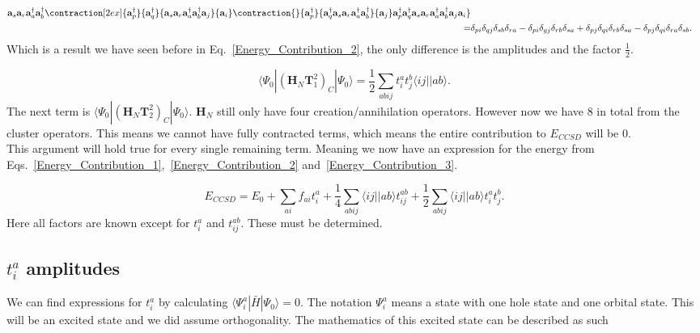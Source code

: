 \documentclass[graybox,sectrefs,envcountresetchap,open=right]{svmonodo}
\begin{document}
\begin{align}
{\mathbf{a}_s}{\mathbf{a}_r}{\mathbf{a}^{\dagger}_a}{\mathbf{a}^{\dagger}_b}
\contraction[2ex]{\mathbf{a}^{\dagger}_p}{\mathbf{a}^{\dagger}_q}{\mathbf{a}_s \mathbf{a}_r
\mathbf{a}^{\dagger}_a \mathbf{a}^{\dagger}_b\mathbf{a}_j}{\mathbf{a}_i}
\contraction{}{\mathbf{a}^{\dagger}_p}{\mathbf{a}^{\dagger}_q 
\mathbf{a}_s \mathbf{a}_r \mathbf{a}^{\dagger}_a \mathbf{a}^{\dagger}_b}{\mathbf{a}_j}
\mathbf{a}^{\dagger}_p \mathbf{a}^{\dagger}_q 
\mathbf{a}_s \mathbf{a}_r
\mathbf{a}^{\dagger}_a \mathbf{a}^{\dagger}_b
\mathbf{a}_j \mathbf{a}_i
\} \nonumber \\
 = & \delta_{pi} \delta_{qj} \delta_{sb} \delta_{ra} 
- \delta_{pi} \delta_{gj} \delta_{rb} \delta_{sa}
+ \delta_{pj} \delta_{qi} \delta_{rb} \delta_{sa}
- \delta_{pj} \delta_{qi} \delta_{ra} \delta_{sb} .
\end{align} 
Which is a result we have seen before in Eq.~\ref{Energy_Contribution_2}, the only difference is the amplitudes and the factor $\frac{1}{2}$.

\begin{equation}
\langle \Psi_0 | (\mathbf{H}_N \mathbf{T}_1^2)_C | \Psi_0 \rangle = \frac{1}{2} \sum_{abij} t_{i}^{a} t_j^b \langle ij||ab \rangle . \label{Energy_Contribution_3}
\end{equation} 
The next term is $\langle \Psi_0 | (\mathbf{H}_N \mathbf{T}_2^2)_C | \Psi_0 \rangle$. $\mathbf{H}_N$ still only have four creation/annihilation operators. However now we have 8 in total from the cluster operators. This means we cannot have fully contracted terms, which means the entire contribution to $E_{CCSD}$ will be 0. \\

This argument will hold true for every single remaining term. Meaning we now have an expression for the energy from Eqs.~\ref{Energy_Contribution_1},~\ref{Energy_Contribution_2} and~\ref{Energy_Contribution_3}.

\begin{equation}
E_{CCSD} = E_0 + \sum_{ai} f_{ai} t_i^a + \frac{1}{4} \sum_{abij} \langle ij||ab \rangle t_{ij}^{ab} + \frac{1}{2} \sum_{abij} \langle ij || ab \rangle t_i^a t_j^b . \label{CCSD_TOTAL_ENERGY}
\end{equation} 
Here all factors are known except for $t_i^a$ and $t_{ij}^{ab}$. These must be determined.

\subsection{$t_i^a$ amplitudes}
We can find expressions for $t_i^a$ by calculating $\langle \Psi_i^a | \bar{H} | \Psi_0 \rangle = 0$. The notation $\Psi_i^a$ means a state with one hole state and one orbital state. This will be an excited state and we did assume orthogonality. The mathematics of this excited state can be described as such
\end{document}
